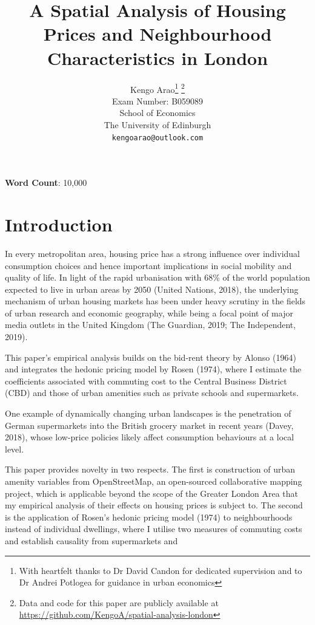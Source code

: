 \documentclass{article}
\title{A Spatial Analysis of Housing Prices and Neighbourhood Characteristics in London}
\author{
  \large{Kengo Arao}\thanks{With heartfelt thanks to Dr David Candon for dedicated supervision and to Dr Andrei Potlogea for guidance in urban economics}      \thanks{Data and code for this paper are publicly available at \href{https://github.com/KengoA/spatial-analysis-london}{https://github.com/KengoA/spatial-analysis-london}} \\
  Exam Number: B059089 \\
  School of Economics\\
  The University of Edinburgh\\
  \texttt{kengoarao@outlook.com}
}
\begin{document}
\maketitle

\begin{abstract}
\lipsum[1]
\end{abstract}

\begin{center}
    \textbf{Word Count}: 10,000
\end{center}

\newpage
\tableofcontents

\newpage
\section{Introduction}
 In every metropolitan area, housing price has a strong influence over individual consumption choices and hence important implications in social mobility and quality of life. In light of the rapid urbanisation with 68\% of the world population expected to live in urban areas by 2050 (United Nations, 2018), the underlying mechanism of urban housing markets has been under heavy scrutiny in the fields of urban research and economic geography, while being a focal point of major media outlets in the United Kingdom (The Guardian, 2019; The Independent, 2019).
 
 This paper's empirical analysis builds on the bid-rent theory by Alonso (1964) and integrates the hedonic pricing model by Rosen (1974), where I estimate the coefficients associated with commuting cost to the Central Business District (CBD) and those of urban amenities such as private schools and supermarkets. 
 
 
  One example of dynamically changing urban landscapes is the penetration of German supermarkets into the British grocery market in recent years (Davey, 2018), whose low-price policies likely affect consumption behaviours at a local level. 


This paper provides novelty in two respects. The first is construction of urban amenity variables from OpenStreetMap, an open-sourced collaborative mapping project, which is applicable beyond the scope of the Greater London Area that my empirical analysis of their effects on housing prices is subject to. The second is the application of Rosen's hedonic pricing model (1974) to neighbourhoods instead of individual dwellings, where I utilise two measures of commuting costs and 
establish causality from supermarkets and 
\end{document}
